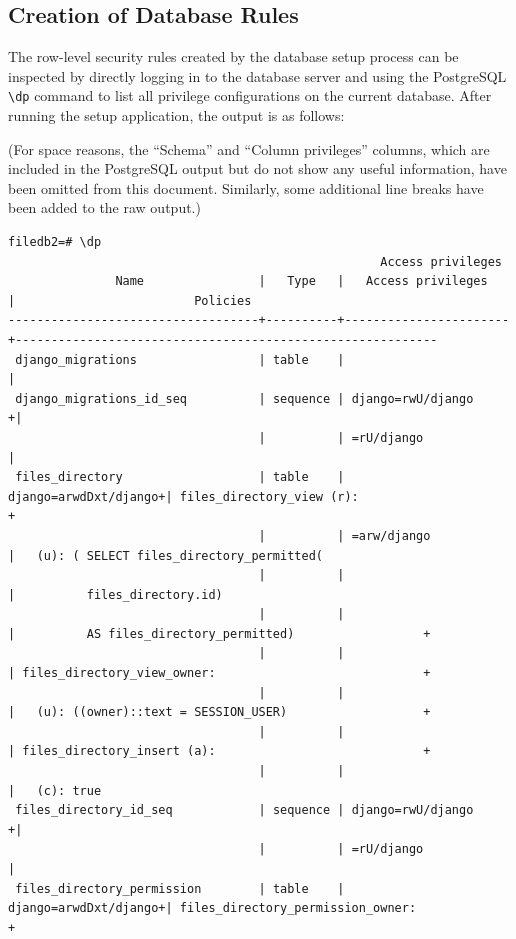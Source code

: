 \documentclass[12pt]{report}
\begin{document}
\begin{landscape}
  \section{Creation of Database Rules}
  The row-level security rules created by the database setup process can be inspected by directly logging in to the database server and using the PostgreSQL \verb+\dp+ command to list all privilege configurations on the current database. After running the setup application, the output is as follows:

  (For space reasons, the ``Schema'' and ``Column privileges'' columns, which are included in the PostgreSQL output but do not show any useful information, have been omitted from this document. Similarly, some additional line breaks have been added to the raw output.)
  {\footnotesize
\begin{verbatim}
filedb2=# \dp
                                                    Access privileges
               Name                |   Type   |   Access privileges   |                         Policies
-----------------------------------+----------+-----------------------+-----------------------------------------------------------
 django_migrations                 | table    |                       |
 django_migrations_id_seq          | sequence | django=rwU/django    +|
                                   |          | =rU/django            |
 files_directory                   | table    | django=arwdDxt/django+| files_directory_view (r):                               +
                                   |          | =arw/django           |   (u): ( SELECT files_directory_permitted(
                                   |          |                       |          files_directory.id)
                                   |          |                       |          AS files_directory_permitted)                  +
                                   |          |                       | files_directory_view_owner:                             +
                                   |          |                       |   (u): ((owner)::text = SESSION_USER)                   +
                                   |          |                       | files_directory_insert (a):                             +
                                   |          |                       |   (c): true
 files_directory_id_seq            | sequence | django=rwU/django    +|
                                   |          | =rU/django            |
 files_directory_permission        | table    | django=arwdDxt/django+| files_directory_permission_owner:                       +

\end{verbatim}}
\end{landscape}
\end{document}
